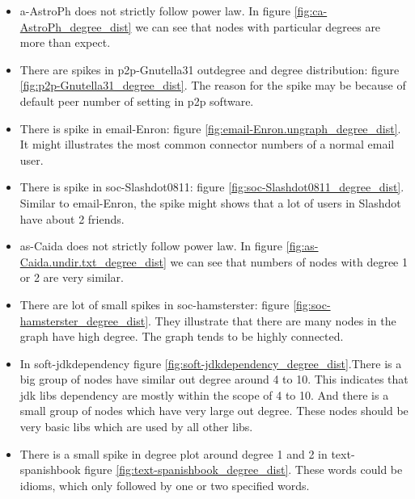 \begin{itemize} 
\item a-AstroPh does not strictly follow power law. In figure \ref{fig:ca-AstroPh_degree_dist} we can see that nodes with particular degrees are more than expect. \\
\item There are spikes in p2p-Gnutella31 outdegree and degree distribution: figure \ref{fig:p2p-Gnutella31_degree_dist}. The reason for the spike may be because of default peer number of setting in p2p software. \\
\item There is spike in email-Enron: figure \ref{fig:email-Enron.ungraph_degree_dist}. It might illustrates the most common connector numbers of a normal email user.\\
\item There is spike in soc-Slashdot0811: figure \ref{fig:soc-Slashdot0811_degree_dist}. Similar to email-Enron, the spike might shows that a lot of users in Slashdot have about 2 friends.\\
\item as-Caida does not strictly follow power law. In figure \ref{fig:as-Caida.undir.txt_degree_dist} we can see that numbers of nodes with degree 1 or 2 are very similar. \\
\item There are lot of small spikes in soc-hamsterster: figure \ref{fig:soc-hamsterster_degree_dist}. They illustrate that there are many nodes in the graph have high degree. The graph tends to be highly connected.\\
\item In soft-jdkdependency figure \ref{fig:soft-jdkdependency_degree_dist}.There is a big group of nodes have similar out degree around 4 to 10. This indicates that jdk libs dependency are mostly within the scope of 4 to 10. And there is a small group of nodes which have very large out degree. These nodes should be very basic libs which are used by all other libs.\\
\item There is a small spike in degree plot around degree 1 and 2 in text-spanishbook figure \ref{fig:text-spanishbook_degree_dist}. These words could be idioms, which only followed by one or two specified words.
\end{itemize}

